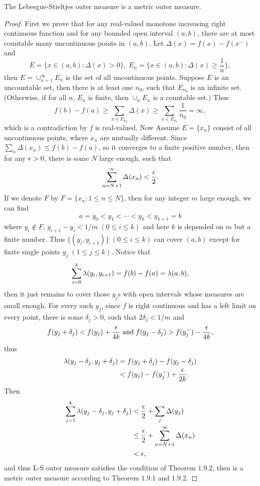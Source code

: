 \begin{pro}%
	The Lebesgue-Stieltjes outer measure is a metric outer measure.
\end{pro}
\begin{proof}
	 First we prove that for any real-valued monotone increasing right continuous function and for any bounded open interval $(a,b)$, there are at most countable many uncontinuous points in $(a,b)$. Let $\Delta(x)=f(x)-f(x^-)$ and
	 \[E=\{x\in(a,b)\colon \Delta(x)>0\},\;E_n=\{x\in(a,b)\colon \Delta(x)\geq \frac{1}{n}\},\]
	 then $E=\cup_{n=1}^\infty E_n$ is the set of all uncontinuous points. Suppose $E$ is an uncountable set, then there is at least one $n_0$, such that $E_{n_0}$ is an infinite set.(Otherwise, if for all $n$, $E_n$ is finite, then $\cup_n E_n$ is a countable set.) Thus
	 \[f(b)-f(a)\geq \sum_{x\in E_{n_0}}\Delta(x)\geq \sum_{x\in E_{n_0}}\frac{1}{n_0}=\infty,\]
	 which is a contradiction by $f$ is real-valued.
	 Now Assume $E=\{x_n\}$ consist of all uncontinuous points, where $x_n$ are mutually different. Since $\sum_{n} \Delta(x_n)\leq f(b)-f(a)$, so it converges to a finite positive number, then for any $\epsilon>0$, there is some $N$ large enough, such that
	 \[\sum_{n=N+1}^{\infty} \Delta(x_n)<\frac{\epsilon}{2}.\]
	 If we denote $F$ by $F=\{x_n\colon 1\leq n\leq N\}$, then for any integer $m$ large enough, we can find
	 \[a=y_0<y_1<\cdots<y_k<y_{k+1}=b\]
	 where $y_i\not\in F$, $y_{i+1}-y_{i}<1/m\;(0\leq i\leq k)$ and here $k$ is depended on $m$ but a finite number. Thus $\{(y_i,y_{i+1})\}\;(0\leq i\leq k)$ can cover $(a,b)$ except for finite single points $y_j\;(1\leq j\leq k)$. Notice that 
	 \[\sum_{i=0}^k \lambda(y_i,y_{i+1})=f(b)-f(a)=\lambda(a,b),\] then it just remains to cover those $y_j$s with open intervals whose measures are small enough.
	 For every such $y_j$, since $f$ is right continuous and has a left limit on every point, there is some $\delta_j>0$, such that $2\delta_j<1/m$ and
	 \[f(y_j+\delta_j)<f(y_j)+\frac{\epsilon}{4k}\;\mbox{and}\;f(y_j-\delta_j)>f(y_j^-)-\frac{\epsilon}{4k},\]
	 thus
	 \begin{align*}
	 	\lambda(y_j-\delta_j,y_j+\delta_j)&=f(y_j+\delta_j)-f(y_j-\delta_j)\\
	 	&< f(y_j)-f(y_j^-)+\frac{\epsilon}{2k}.
	 \end{align*}
	 Then 
	 \begin{align*}
	 \sum_{j=1}^k \lambda(y_j-\delta_j,y_j+\delta_j)&<\frac{\epsilon}{2}+\sum_j \Delta(y_j)\\
	 &\leq \frac{\epsilon}{2}+\sum_{n=N+1}^{\infty} \Delta(x_n)\\
	 &<\epsilon,
	 \end{align*}
	 and thus L-S outer measure satisfies the condition of Theorem $1.9.2$, then is a metric outer measure according to Theorem $1.9.1$ and $1.9.2$.
\end{proof}

